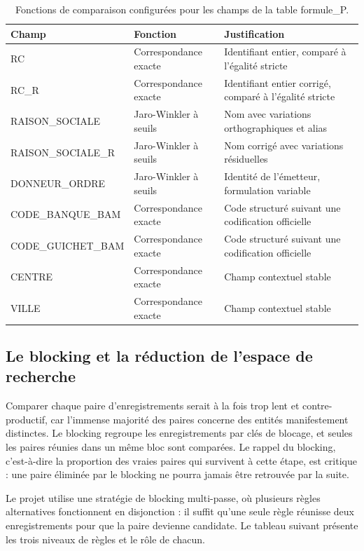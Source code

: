 \begin{table}[H]
\centering
\caption{Fonctions de comparaison configurées pour les champs de la table formule\_P.}
\renewcommand{\arraystretch}{1.3}
\setlength{\tabcolsep}{3pt}
{\small
\begin{tabular}{|p{4.0cm}|p{3.6cm}|p{6.0cm}|}
\hline
\textbf{Champ} & \textbf{Fonction} & \textbf{Justification} \\
\hline
RC & Correspondance exacte & Identifiant entier, comparé à l'égalité stricte \\
\hline
RC\_R & Correspondance exacte & Identifiant entier corrigé, comparé à l'égalité stricte \\
\hline
RAISON\_SOCIALE & Jaro-Winkler à seuils & Nom avec variations orthographiques et alias \\
\hline
RAISON\_SOCIALE\_R & Jaro-Winkler à seuils & Nom corrigé avec variations résiduelles \\
\hline
DONNEUR\_ORDRE & Jaro-Winkler à seuils & Identité de l'émetteur, formulation variable \\
\hline
CODE\_BANQUE\_BAM & Correspondance exacte & Code structuré suivant une codification officielle \\
\hline
CODE\_GUICHET\_BAM & Correspondance exacte & Code structuré suivant une codification officielle \\
\hline
CENTRE & Correspondance exacte & Champ contextuel stable \\
\hline
VILLE & Correspondance exacte & Champ contextuel stable \\
\hline
\end{tabular}
}
\end{table}

\subsection{Le blocking et la réduction de l'espace de recherche}

Comparer chaque paire d'enregistrements serait à la fois trop lent et contre-productif, car l'immense majorité des paires concerne des entités manifestement distinctes. Le blocking regroupe les enregistrements par clés de blocage, et seules les paires réunies dans un même bloc sont comparées. Le rappel du blocking, c'est-à-dire la proportion des vraies paires qui survivent à cette étape, est critique : une paire éliminée par le blocking ne pourra jamais être retrouvée par la suite.

Le projet utilise une stratégie de blocking multi-passe, où plusieurs règles alternatives fonctionnent en disjonction : il suffit qu'une seule règle réunisse deux enregistrements pour que la paire devienne candidate. Le tableau suivant présente les trois niveaux de règles et le rôle de chacun.

